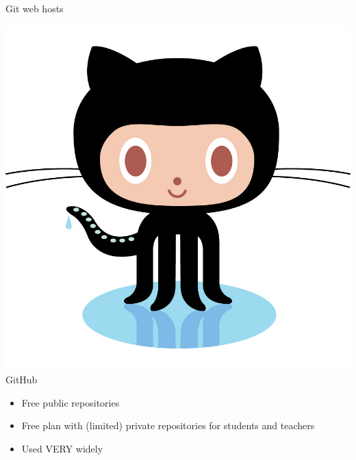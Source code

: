 \documentclass[xcolor=dvipsnames]{beamer}
\begin{document}
\begin{frame}{Git web hosts}

\includegraphics[scale=.03]{octocat} {\LARGE GitHub}
\begin{itemize}
\item Free public repositories
\item Free plan with (limited) private repositories for students and teachers
\item Used VERY widely
\end{itemize}


\end{frame}
\end{document}
